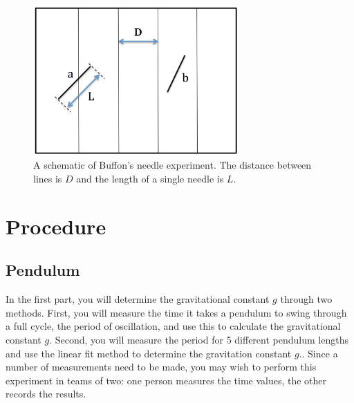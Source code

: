 \begin{figure}[h]
\centering
\includegraphics[width=0.7\textwidth]{./Exp1/pic/buffon.png}
\caption{A schematic of Buffon's needle experiment. The distance between lines is $D$ and the length of a single needle is $L$.}
\label{fig:buffon}
\end{figure}

\section{Procedure}
\subsection{Pendulum}

In the first part, you will determine the gravitational constant $g$ through two methods. First, you will measure the time it takes a pendulum to swing through a full cycle, the period of oscillation, and use this to calculate the gravitational constant $g$. Second, you will measure the period for 5 different pendulum lengths and use the linear fit method to determine the gravitation constant $g$.. Since a number of measurements need to be made, you may wish to perform this experiment in teams of two: one person measures the time values, the other records the results. \myskip

